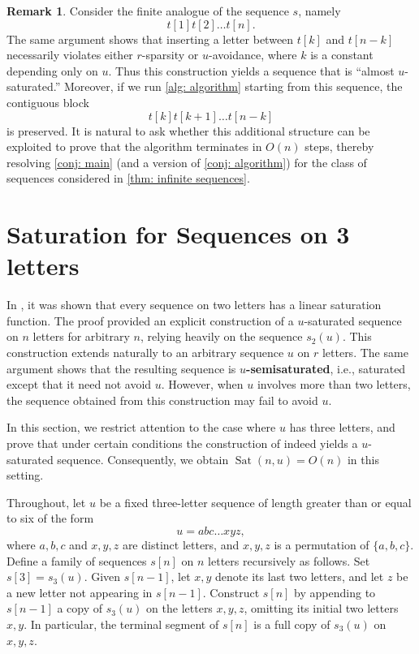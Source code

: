 \documentclass[12pt]{amsart}
\DeclareMathOperator{\Sat}{Sat}
\theoremstyle{definition}
\newtheorem{rem}{Remark}
\numberwithin{equation}{section}
\numberwithin{table}{thm}
\begin{document}
\begin{rem}
    Consider the finite analogue of the sequence $s$, namely
    \[
    t[1]t[2]\dots t[n].
    \]
    The same argument shows that inserting a letter between $t[k]$ and $t[n-k]$ necessarily violates either $r$-sparsity or $u$-avoidance, where $k$ is a constant depending only on $u$. Thus this construction yields a sequence that is ``almost $u$-saturated.'' Moreover, if we run \cref{alg: algorithm} starting from this sequence, the contiguous block 
    \[
    t[k]t[k+1]\dots t[n-k]
    \] 
    is preserved. It is natural to ask whether this additional structure can be exploited to prove that the algorithm terminates in $O(n)$ steps, thereby resolving \cref{conj: main} (and a version of \cref{conj: algorithm}) for the class of sequences considered in \cref{thm: infinite sequences}.
\end{rem}




\section{Saturation for Sequences on 3 letters}\label{sec: 3-letter sequences}
In \cite{ANAND2025382}, it was shown that every sequence on two letters has a linear saturation function. The proof provided an explicit construction of a $u$-saturated sequence on $n$ letters for arbitrary $n$, relying heavily on the sequence $s_2(u)$. This construction extends naturally to an arbitrary sequence $u$ on $r$ letters. The same argument shows that the resulting sequence is \textbf{$u$-semisaturated}, i.e., saturated except that it need not avoid $u$. However, when $u$ involves more than two letters, the sequence obtained from this construction may fail to avoid $u$.  

In this section, we restrict attention to the case where $u$ has three letters, and prove that under certain conditions the construction of \cite{ANAND2025382} indeed yields a $u$-saturated sequence. Consequently, we obtain $\Sat(n,u)=O(n)$ in this setting.  

Throughout, let $u$ be a fixed three-letter sequence of length greater than or equal to six of the form
\[
u = abc\dots xyz,
\]
where $a,b,c$ and $x,y,z$ are distinct letters, and $x,y,z$ is a permutation of $\{a,b,c\}$. Define a family of sequences $s[n]$ on $n$ letters recursively as follows. Set $s[3]=s_3(u)$. Given $s[n-1]$, let $x,y$ denote its last two letters, and let $z$ be a new letter not appearing in $s[n-1]$. Construct $s[n]$ by appending to $s[n-1]$ a copy of $s_3(u)$ on the letters $x,y,z$, omitting its initial two letters $x,y$. In particular, the terminal segment of $s[n]$ is a full copy of $s_3(u)$ on $x,y,z$.  
\end{document}

